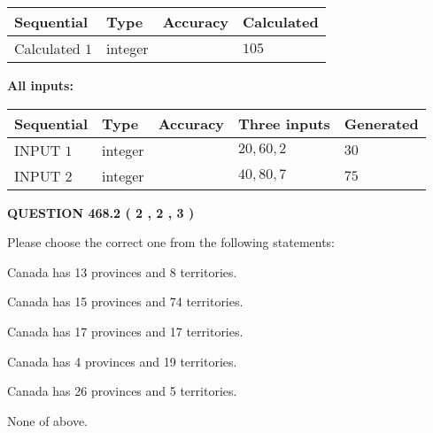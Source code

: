 \documentclass[12pt]{article}
\begin{document}
   
   
   
\noindent{}
   
   
  
  
\noindent\begin{tabular}{|l|l|l|l|}
\hline
 Sequential & Type & Accuracy & Calculated \\ 
\hline
 
 
  Calculated $  1 $ & integer &  & 
  $ 105 $ 
 \\  \hline  
 \end{tabular}
   
   
   
   
\noindent\vspace{0.1in}\hspace{-0.08in} {\textbf{\Large{All inputs: }}}
   
   
  
  
\noindent\begin{tabular}{|l|l|l|l|l|}
\hline
 Sequential & Type & Accuracy & Three inputs & Generated \\ 
\hline
 
 
  INPUT $  1 $ & integer &  & $
 20
 , 
 60
 , 
 2
 $ & $ 30 $ 
 \\  \hline  
 
 
  INPUT $  2 $ & integer &  & $
 40
 , 
 80
 , 
 7
 $ & $ 75 $ 
 \\  \hline  
 \end{tabular}
   
   
  
\vspace{0.2in}
  
{\textbf{\Large{QUESTION
468.2 
 ( 2 , 2 , 3 )
}}}
  
  
Please choose the correct one from the following statements:
 
 
Canada has  13 provinces and  8 territories.
 
 
Canada has  15 provinces and  74 territories.
 
 
Canada has  17 provinces and  17 territories.
 
 
Canada has   4 provinces and  19 territories.
 
 
Canada has  26 provinces and  5 territories.
 
 
 None of above.
 
\end{document}
